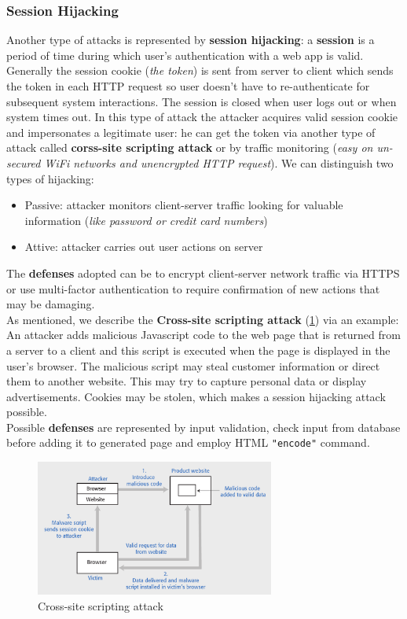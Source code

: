 \documentclass[10pt,a4paper]{report}
\begin{document}
\subsubsection{Session Hijacking}
Another type of attacks is represented by \textbf{session hijacking}: a \textbf{session} is a period of time during which user's authentication with a web app is valid. Generally the session cookie (\textit{the token}) is sent from server to client which sends the token in each HTTP request so user doesn't have to re-authenticate for subsequent system interactions. The session is closed when user logs out or when system times out. In this type of attack the attacker acquires valid session cookie and impersonates a legitimate user: he can get the token via another type of attack called \textbf{corss-site scripting attack} or by traffic monitoring (\textit{easy on un-secured WiFi networks and unencrypted HTTP request}).
We can distinguish two types of hijacking:
\begin{itemize}
	\item Passive: attacker monitors client-server traffic looking for valuable information (\textit{like password or credit card numbers})
	\item Attive: attacker carries out user actions on server
\end{itemize}
The \textbf{defenses} adopted can be to encrypt client-server network traffic via HTTPS or use multi-factor authentication to require confirmation of new actions that may be damaging.\\
As mentioned, we describe the \textbf{Cross-site scripting attack} (\ref{image85}) via an example: An attacker adds malicious Javascript code to the web page that is returned from a server to a client and this script is executed when the
page is displayed in the user’s browser. The malicious script may steal customer information or direct them to
another website. This may try to capture personal data or display advertisements. Cookies may be stolen, which makes a session hijacking attack possible.\\
Possible \textbf{defenses} are represented by input validation, check input from database before adding it to generated page and employ HTML \texttt{"encode"} command. 
\begin{figure}[h]
	\centering
	\includegraphics[width=0.7\textwidth]{image85}
	\caption{Cross-site scripting attack}
	\label{image85}
\end{figure} 
\end{document}
